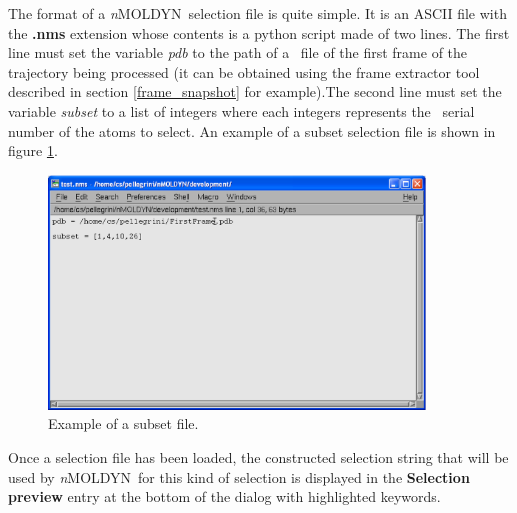 \documentclass[a4paper,11pt]{report}
\newcommand{\NMOLDYN}{\textit{n}MOLDYN}
\begin{document}
The format of a \NMOLDYN\ selection file is quite simple. It is an ASCII file with the \textbf{.nms} extension whose contents is a 
python script made of two lines. The first line must set the variable \textit{pdb} to the path of a \PDB\ file of the first frame of the trajectory being 
processed (it can be obtained using the frame extractor tool described in section \ref{frame_snapshot} for example).The second 
line must set the variable \textit{subset} to a list of integers where each integers represents the \PDB\ serial number of the atoms 
to select. An example of a subset selection file is shown in figure \ref{fig:subset_selection_file}.
\begin{figure}[h!]
\begin{center}
\includegraphics[width=10cm]{Figures/subset_selection_file.eps}
\end{center}
\caption[Example of a subset selection file]{Example of a subset file.}
\label{fig:subset_selection_file}
\end{figure}   

Once a selection file has been loaded, the constructed selection string that will be used by \NMOLDYN\ for this kind of selection is 
displayed in the \textbf{Selection preview} entry at the bottom of the dialog with highlighted keywords.
\end{document}
